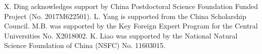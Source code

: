 \documentclass[twocolumn]{aastex62}
\begin{document}
X. Ding acknowledges support by China Postdoctoral Science Foundation Funded Project (No. 2017M622501).
L. Yang is supported from the China Scholarship Council. 
M.B. was supported by the Key Foreign Expert Program for the Central Universities No. X2018002.
K. Liao was supported by the National Natural Science Foundation of China (NSFC) No. 11603015.

\newpage




%
\end{document}
